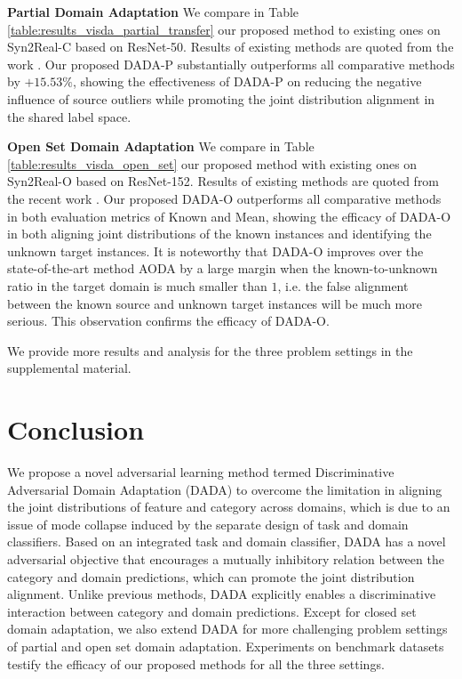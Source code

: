 \documentclass[letterpaper]{article} \usepackage{aaai20}  \usepackage{times}  \usepackage{helvet} \usepackage{courier}  \usepackage[hyphens]{url}  \usepackage{graphicx} \urlstyle{rm} \def\UrlFont{\rm}  \usepackage{graphicx}  \frenchspacing  \setlength{\pdfpagewidth}{8.5in}  \setlength{\pdfpageheight}{11in}
\begin{document}
\noindent\textbf{Partial Domain Adaptation} We compare in Table \ref{table:results_visda_partial_transfer} our proposed method to existing ones on Syn2Real-C based on ResNet-50. Results of existing methods are quoted from the work \cite{pada}. Our proposed DADA-P substantially outperforms all comparative methods by $+15.53\%$, showing the effectiveness of DADA-P on reducing the negative influence of source outliers while promoting the joint distribution alignment in the shared label space. 

\noindent\textbf{Open Set Domain Adaptation} We compare in Table \ref{table:results_visda_open_set} our proposed method with existing ones on Syn2Real-O based on ResNet-152. Results of existing methods are quoted from the recent work \cite{visda}. Our proposed DADA-O outperforms all comparative methods in both evaluation metrics of Known and Mean, showing the efficacy of DADA-O in both aligning joint distributions of the known instances and identifying the unknown target instances. It is noteworthy that DADA-O improves over the state-of-the-art method AODA by a large margin when the known-to-unknown ratio in the target domain is much smaller than $1$, i.e. the false alignment between the known source and unknown target instances will be much more serious. This observation confirms the efficacy of DADA-O.

We provide more results and analysis for the three problem settings in the supplemental material.

\section{Conclusion}
We propose a novel adversarial learning method termed Discriminative Adversarial Domain Adaptation (DADA) to overcome the limitation in aligning the joint distributions of feature and category across domains, which is due to an issue of mode collapse induced by the separate design of task and domain classifiers. Based on an integrated task and domain classifier, DADA has a novel adversarial objective that encourages a mutually inhibitory relation between the category and domain predictions, which can promote the joint distribution alignment. Unlike previous methods, DADA explicitly enables a discriminative interaction between category and domain predictions. Except for closed set domain adaptation, we also extend DADA for more challenging problem settings of partial and open set domain adaptation. Experiments on benchmark datasets testify the efficacy of our proposed methods for all the three settings.
\end{document}
